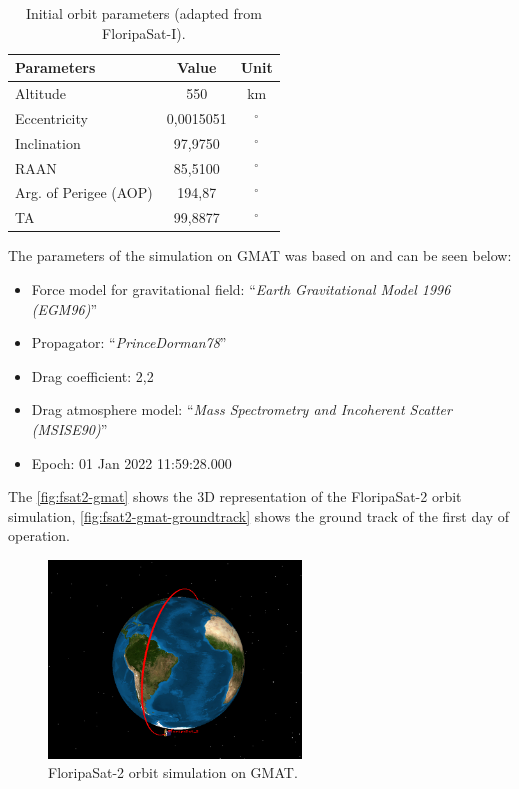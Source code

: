 \begin{table}[!h]
    \centering
    \begin{tabular}{lcc}
        \toprule[1.5pt]
        \textbf{Parameters} & \textbf{Value} & \textbf{Unit} \\
        \midrule
        Altitude                & 550           & km \\
        Eccentricity            & 0,0015051     & $^{\circ}$ \\
        Inclination             & 97,9750       & $^{\circ}$ \\
        RAAN                    & 85,5100       & $^{\circ}$ \\
        Arg. of Perigee (AOP)   & 194,87        & $^{\circ}$ \\
        TA                      & 99,8877       & $^{\circ}$ \\
        \bottomrule[1.5pt]
    \end{tabular}
    \caption{Initial orbit parameters (adapted from FloripaSat-I).}
    \label{tab:orbit-parameters}
\end{table}

The parameters of the simulation on GMAT was based on \cite{marino2016} and can be seen below:

\begin{itemize}
    \item Force model for gravitational field: ``\textit{Earth Gravitational Model 1996 (EGM96)}''
    \item Propagator: ``\textit{PrinceDorman78}''
    \item Drag coefficient: 2,2
    \item Drag atmosphere model: ``\textit{Mass Spectrometry and Incoherent Scatter (MSISE90)}''
    \item Epoch: 01 Jan 2022 11:59:28.000
\end{itemize}

The \autoref{fig:fsat2-gmat} shows the 3D representation of the FloripaSat-2 orbit simulation, \autoref{fig:fsat2-gmat-groundtrack} shows the ground track of the first day of operation.

\begin{figure}[!ht]
    \begin{center}
        \includegraphics[width=0.6\textwidth]{figures/fsat2-gmat.png}
        \caption{FloripaSat-2 orbit simulation on GMAT.}
        \label{fig:fsat2-gmat}
    \end{center}
\end{figure}

